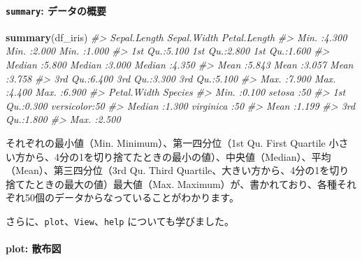 \documentclass[
  xelatex, ja=standard]{bxjsbook}
\newenvironment{Shaded}{\begin{snugshade}}{\end{snugshade}}
\newcommand{\CommentTok}[1]{\textcolor[rgb]{0.56,0.35,0.01}{\textit{#1}}}
\newcommand{\FunctionTok}[1]{\textcolor[rgb]{0.13,0.29,0.53}{\textbf{#1}}}
\newcommand{\NormalTok}[1]{#1}
\newcommand{\SpecialCharTok}[1]{\textcolor[rgb]{0.81,0.36,0.00}{\textbf{#1}}}
\theoremstyle{definition}
\theoremstyle{definition}
\theoremstyle{definition}
\theoremstyle{definition}
\theoremstyle{remark}
\begin{document}
\hypertarget{summary-ux30c7ux30fcux30bfux306eux6982ux8981}{%
\paragraph{\texorpdfstring{\texttt{summary}: データの概要}{summary: データの概要}}\label{summary-ux30c7ux30fcux30bfux306eux6982ux8981}}

\begin{Shaded}
\begin{Highlighting}[]
\FunctionTok{summary}\NormalTok{(df\_iris)}
\CommentTok{\#\textgreater{}   Sepal.Length    Sepal.Width     Petal.Length  }
\CommentTok{\#\textgreater{}  Min.   :4.300   Min.   :2.000   Min.   :1.000  }
\CommentTok{\#\textgreater{}  1st Qu.:5.100   1st Qu.:2.800   1st Qu.:1.600  }
\CommentTok{\#\textgreater{}  Median :5.800   Median :3.000   Median :4.350  }
\CommentTok{\#\textgreater{}  Mean   :5.843   Mean   :3.057   Mean   :3.758  }
\CommentTok{\#\textgreater{}  3rd Qu.:6.400   3rd Qu.:3.300   3rd Qu.:5.100  }
\CommentTok{\#\textgreater{}  Max.   :7.900   Max.   :4.400   Max.   :6.900  }
\CommentTok{\#\textgreater{}   Petal.Width          Species  }
\CommentTok{\#\textgreater{}  Min.   :0.100   setosa    :50  }
\CommentTok{\#\textgreater{}  1st Qu.:0.300   versicolor:50  }
\CommentTok{\#\textgreater{}  Median :1.300   virginica :50  }
\CommentTok{\#\textgreater{}  Mean   :1.199                  }
\CommentTok{\#\textgreater{}  3rd Qu.:1.800                  }
\CommentTok{\#\textgreater{}  Max.   :2.500}
\end{Highlighting}
\end{Shaded}

それぞれの最小値（Min. Minimum）、第一四分位（1st Qu. First Quartile 小さい方から、4分の1を切り捨てたときの最小の値）、中央値（Median）、平均（Mean）、第三四分位（3rd Qu. Third Quartile、大きい方から、4分の1を切り捨てたときの最大の値）最大値（Max. Maximum）が、書かれており、各種それぞれ50個のデータからなっていることがわかります。

さらに、\texttt{plot}、\texttt{View}、\texttt{help} についても学びました。

\hypertarget{plot-ux6563ux5e03ux56f3}{%
\paragraph{plot: 散布図}\label{plot-ux6563ux5e03ux56f3}}

\begin{Shaded}
\end{Shaded}
\end{document}
